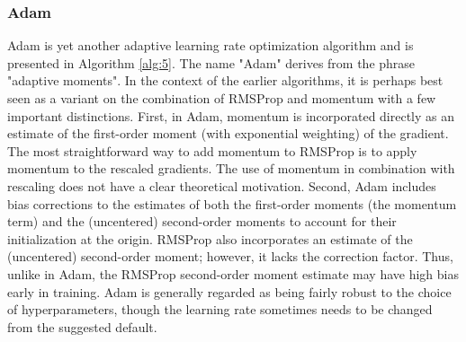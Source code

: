             
    \subsubsection{Adam}
        Adam \cite{DBLP:journals/corr/KingmaB14} is yet another adaptive learning rate optimization
        algorithm and is presented in Algorithm \ref{alg:5}. The name "Adam" derives from
        the phrase "adaptive moments". In the context of the earlier algorithms, it is
        perhaps best seen as a variant on the combination of RMSProp and momentum
        with a few important distinctions. First, in Adam, momentum is incorporated
        directly as an estimate of the first-order moment (with exponential weighting) of
        the gradient. The most straightforward way to add momentum to RMSProp is to
        apply momentum to the rescaled gradients. The use of momentum in combination
        with rescaling does not have a clear theoretical motivation. Second, Adam includes
        bias corrections to the estimates of both the first-order moments (the momentum
        term) and the (uncentered) second-order moments to account for their initialization
        at the origin. RMSProp also incorporates an estimate of the
        (uncentered) second-order moment; however, it lacks the correction factor. Thus,
        unlike in Adam, the RMSProp second-order moment estimate may have high bias
        early in training. Adam is generally regarded as being fairly robust to the choice
        of hyperparameters, though the learning rate sometimes needs to be changed from
        the suggested default.
         \vspace{5mm}
        \par
